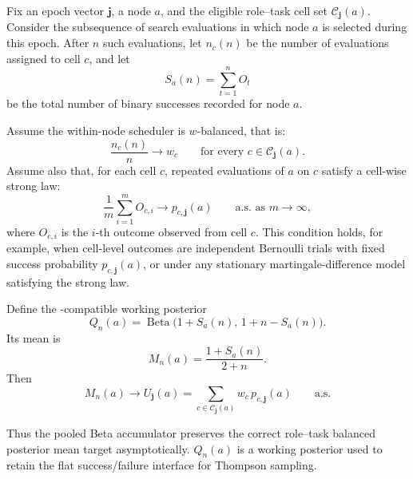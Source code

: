 \begin{proposition}
\label{prop:balanced-working-posterior}
Fix an epoch vector \(\boldsymbol{j}\), a node \(a\), and the eligible role--task cell set
\(\mathcal C_{\boldsymbol{j}}(a)\). Consider the subsequence of search evaluations in which
node \(a\) is selected during this epoch. After \(n\) such evaluations, let
\(n_c(n)\) be the number of evaluations assigned to cell \(c\), and let
\[
S_a(n)=\sum_{t=1}^{n} O_t
\]
be the total number of binary successes recorded for node \(a\).

Assume the within-node scheduler is \(w\)-balanced, that is:
\[
\frac{n_c(n)}{n}\longrightarrow w_c
\qquad\text{for every } c\in \mathcal C_{\boldsymbol{j}}(a).
\]
Assume also that, for each cell \(c\), repeated evaluations of \(a\) on \(c\)
satisfy a cell-wise strong law:
\[
\frac{1}{m}\sum_{i=1}^{m} O_{c,i}
\longrightarrow
p_{c,\boldsymbol{j}}(a)
\qquad\text{a.s. as }m\to\infty,
\]
where \(O_{c,i}\) is the \(i\)-th outcome observed from cell \(c\). This condition
holds, for example, when cell-level outcomes are independent Bernoulli trials
with fixed success probability \(p_{c,\boldsymbol{j}}(a)\), or under any stationary
martingale-difference model satisfying the strong law.

Define the \hgm-compatible working posterior
\[
Q_n(a)
=
\operatorname{Beta}\bigl(1+S_a(n),\,1+n-S_a(n)\bigr).
\]
Its mean is
\[
M_n(a)
=
\frac{1+S_a(n)}{2+n}.
\]
Then
\[
M_n(a)
\longrightarrow
U_{\boldsymbol{j}}(a)
=
\sum_{c\in \mathcal C_{\boldsymbol{j}}(a)} w_c\,p_{c,\boldsymbol{j}}(a)
\qquad\text{a.s.}
\]

Thus the pooled Beta accumulator preserves the correct role--task balanced
posterior mean target asymptotically. \(Q_n(a)\) is a working posterior used to retain the flat \hgm success/failure interface for Thompson sampling.
\end{proposition}


